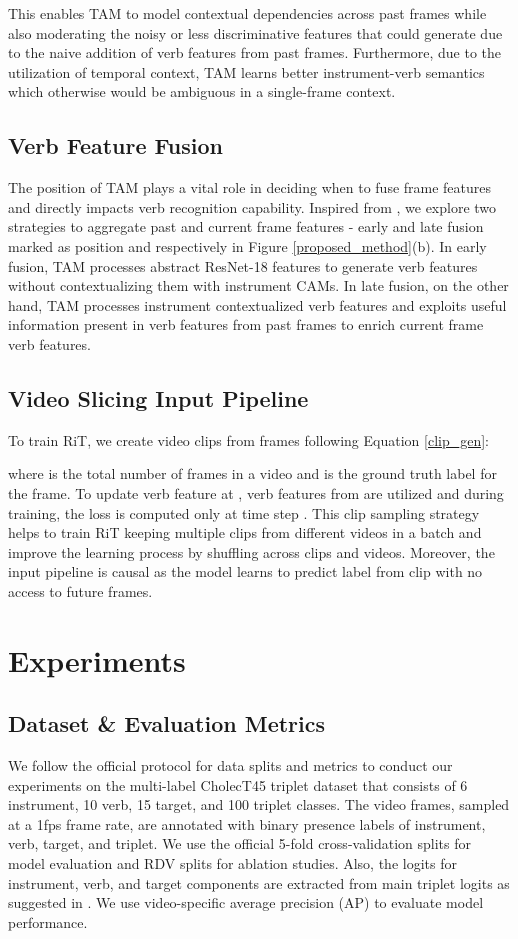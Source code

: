 \documentclass{article}
\begin{document}
This enables TAM to model contextual dependencies across past frames while also moderating the noisy or less discriminative features that could generate due to the naive addition of verb features from past frames. Furthermore, due to the utilization of temporal context, TAM learns better instrument-verb semantics which otherwise would be ambiguous in a single-frame context.

\subsection{Verb Feature Fusion}
The position of TAM plays a vital role in deciding when to fuse frame features and directly impacts verb recognition capability. Inspired from \cite{kpvideo}, we explore two strategies to aggregate past and current frame features - early and late fusion marked as position  and  respectively in Figure \ref{proposed_method}(b). In early fusion, TAM processes abstract ResNet-18 features to generate verb features without contextualizing them with instrument CAMs. In late fusion, on the other hand, TAM processes instrument contextualized verb features and exploits useful information present in verb features from past frames to enrich current frame verb features.

\subsection{Video Slicing Input Pipeline}
\label{clip}
To train RiT, we create video clips from  frames following Equation \ref{clip_gen}:



\noindent where  is the total number of frames in a video and  is the ground truth label for the  frame. To update verb feature at , verb features from  are utilized and during training, the loss is computed only at time step . This clip sampling strategy helps to train RiT keeping multiple clips from different videos in a batch and improve the learning process by shuffling across clips and videos. Moreover, the input pipeline is causal as the model learns to predict label  from clip with no access to future frames. 

\section{Experiments}
\subsection{Dataset \& Evaluation Metrics}
We follow the official protocol for data splits and metrics \cite{ctsplits} to conduct our experiments on the multi-label CholecT45 triplet dataset that consists of 6 instrument, 10 verb, 15 target, and 100 triplet classes. The video frames, sampled at a 1fps frame rate, are annotated with binary presence labels of instrument, verb, target, and triplet. We use the official 5-fold cross-validation splits for model evaluation and RDV splits for ablation studies. Also, the logits for instrument, verb, and target components are extracted from main triplet logits as suggested in \cite{ctsplits}. We use video-specific average precision (AP) to evaluate model performance.
\end{document}

